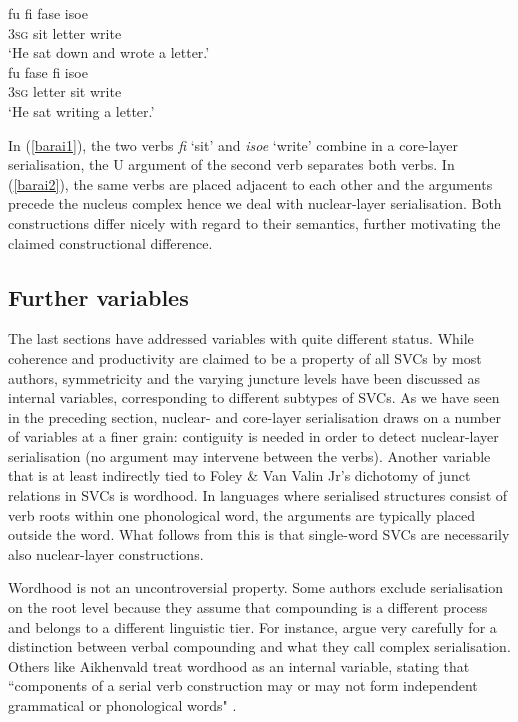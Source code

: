 \ea 
{}
\ea \label{barai1}
\gll fu fi fase isoe \\
\textsc{3}\textsc{sg} sit letter write \\
\glft `He sat down and wrote a letter.' \\ 
\ex \label{barai2}
\gll fu fase fi isoe \\ 
\textsc{3}\textsc{sg} letter sit write \\
\glft `He sat writing a letter.'\\ 
\z
\z

In (\ref{barai1}), the two verbs \textit{fi} `sit' and \textit{isoe} `write' combine in a core-layer serialisation, the U argument of the second verb separates both verbs. In (\ref{barai2}), the same verbs are placed adjacent to each other and the arguments precede the nucleus complex hence we deal with nuclear-layer serialisation. Both constructions differ nicely with regard to their semantics, further motivating the claimed constructional difference.

\subsection{Further variables}

The last sections have addressed variables with quite different status. While coherence and productivity are claimed to be a property of all SVCs by most authors, symmetricity and the varying juncture levels have been discussed as internal variables, corresponding to different subtypes of SVCs. As we have seen in the preceding section, nuclear- and core-layer serialisation draws on a number of variables at a finer grain: contiguity is needed in order to detect nuclear-layer serialisation (no argument may intervene between the verbs). Another variable that is at least indirectly tied to Foley \& Van Valin Jr's dichotomy of junct relations in SVCs is wordhood. In languages where serialised structures consist of verb roots within one phonological word, the arguments are typically placed outside the word. What follows from this is that single-word SVCs are necessarily also nuclear-layer constructions. 

Wordhood is not an uncontroversial property. Some authors exclude serialisation on the root level because they assume that compounding is a different process and belongs to a different linguistic tier. For instance, \citet[27]{vanstaden2008serial} argue very carefully for a distinction between verbal compounding and what they call complex serialisation. Others like Aikhenvald treat wordhood as an internal variable, stating that ``components of a serial verb construction may or may not form independent grammatical or phonological words" \citep[3]{Aikhenvald2006}.

